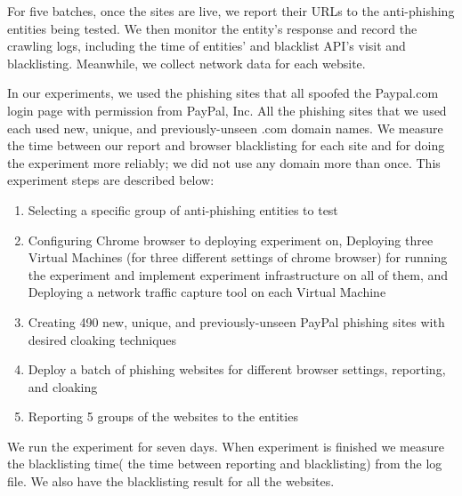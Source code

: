 For five batches, once the sites are live, we report their URLs to the anti-phishing entities being tested. We then monitor the entity's response and record the crawling logs, including the time of entities' and blacklist API's visit and blacklisting. Meanwhile, we collect network data for each website.

In our experiments, we used the phishing sites that all spoofed the Paypal.com login page with permission from PayPal, Inc. All the phishing sites that we used each used new, unique, and previously-unseen .com domain names. We measure the time between our report and browser blacklisting for each site and for doing the experiment more reliably; we did not use any domain more than once.  
This experiment steps are described below:  

\begin{enumerate}
    \item Selecting a specific group of anti-phishing entities to test
    \item Configuring Chrome browser to deploying experiment on, Deploying three Virtual Machines (for three different settings of chrome browser) for running the experiment and implement experiment infrastructure on all of them, and Deploying a network traffic capture tool on each Virtual Machine
    \item Creating 490 new, unique, and previously-unseen PayPal phishing sites with desired cloaking techniques
    \item Deploy a batch of phishing websites for different browser settings, reporting, and cloaking
    \item Reporting 5 groups of the websites to the entities
    
\end{enumerate}

We run the experiment for seven days. When experiment is finished we measure the blacklisting time( the time between reporting and blacklisting) from the log file. We also have the blacklisting result for all the websites.


